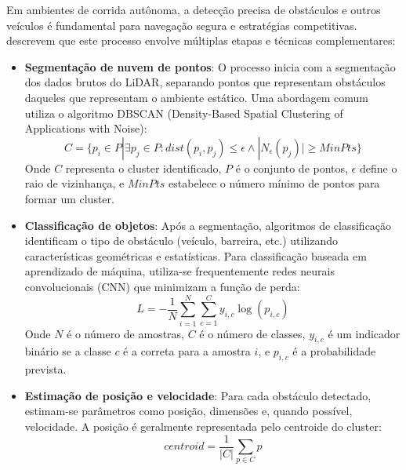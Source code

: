 Em ambientes de corrida autônoma, a detecção precisa de obstáculos e outros
veículos é fundamental para navegação segura e estratégias competitivas.
\cite{Ivanov2020Verifying} descrevem que este processo envolve múltiplas etapas
e técnicas complementares:

\begin{itemize}
    \item \textbf{Segmentação de nuvem de pontos}: O processo inicia com a segmentação dos dados brutos do LiDAR, separando pontos que representam obstáculos daqueles que representam o ambiente estático. Uma abordagem comum utiliza o algoritmo DBSCAN (Density-Based Spatial Clustering of Applications with Noise):
          \begin{equation}
              C = \{p_i \in P | \exists p_j \in P: dist(p_i, p_j) \leq \epsilon \wedge |N_\epsilon(p_j)| \geq MinPts\}
              \label{eq:dbscan_clustering}
          \end{equation}
          Onde $C$ representa o cluster identificado, $P$ é o conjunto de pontos, $\epsilon$ define o raio de vizinhança, e $MinPts$ estabelece o número mínimo de pontos para formar um cluster.

    \item \textbf{Classificação de objetos}: Após a segmentação, algoritmos de classificação identificam o tipo de obstáculo (veículo, barreira, etc.) utilizando características geométricas e estatísticas. Para classificação baseada em aprendizado de máquina, utiliza-se frequentemente redes neurais convolucionais (CNN) que minimizam a função de perda:
          \begin{equation}
              L = -\frac{1}{N} \sum_{i=1}^{N} \sum_{c=1}^{C} y_{i,c} \log(p_{i,c})
              \label{eq:classification_loss}
          \end{equation}
          Onde $N$ é o número de amostras, $C$ é o número de classes, $y_{i,c}$ é um indicador binário se a classe $c$ é a correta para a amostra $i$, e $p_{i,c}$ é a probabilidade prevista.

    \item \textbf{Estimação de posição e velocidade}: Para cada obstáculo detectado, estimam-se parâmetros como posição, dimensões e, quando possível, velocidade. A posição é geralmente representada pelo centroide do cluster:
          \begin{equation}
              centroid = \frac{1}{|C|} \sum_{p \in C} p
              \label{eq:centroid}
          \end{equation}
\end{itemize}

